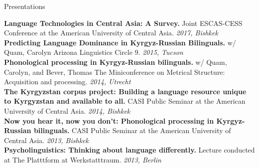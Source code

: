 \documentclass{resume} %
\begin{document}
\begin{minipage}{\textwidth}

\begin{rSection}{Presentations}
\vspace{.25cm}

{\bf Language Technologies in Central Asia: A Survey.} {Joint ESCAS-CESS Conference at the American University of Central Asia.} \hfill {\em 2017, Bishkek} \\

{\bf Predicting Language Dominance in Kyrgyz-Russian Bilinguals.} {w/ Quam, Carolyn} {Arizona Linguistics Circle 9.} \hfill {\em 2015, Tucson} \\

{\bf Phonological processing in Kyrgyz-Russian bilinguals.} {w/ Quam, Carolyn, and Bever, Thomas} {The Miniconference on Metrical Structure: Acquisition and processing.} \hfill {\em 2014, Utrecht} \\

{\bf The Kyrgyzstan corpus project: Building a language resource unique to Kyrgyzstan and available to all.} {CASI Public Seminar at the American University of Central Asia.} \hfill {\em 2014, Bishkek} \\

{\bf Now you hear it, now you don’t: Phonological processing in Kyrgyz-Russian bilinguals.} {CASI Public Seminar at the American University of Central Asia.} \hfill {\em 2013, Bishkek} \\

{\bf Psycholinguistics: Thinking about language differently.} {Lecture conducted at The Platttform at Werkstatttraum.} \hfill {\em 2013, Berlin} \\


\end{rSection}
\end{minipage}
\end{document}
